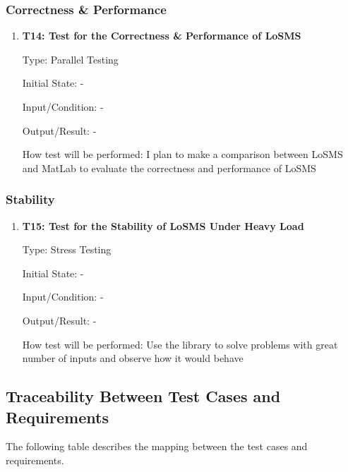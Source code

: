 \documentclass[12pt, titlepage]{article}
\newcommand{\famname}{LoSMS} %
\begin{document}
\subsubsection{Correctness \& Performance}

\begin{enumerate}
	\item{\textbf{T14: Test for the Correctness \& Performance of \famname{}}}
	
	Type: Parallel Testing
	
	Initial State: -
	
	Input/Condition: -
	
	Output/Result: -
	
	How test will be performed: I plan to make a comparison between \famname{} 
	and MatLab to evaluate the correctness and performance of \famname{}
\end{enumerate}

\subsubsection{Stability}

\begin{enumerate}
	\item{\textbf{T15: Test for the Stability of \famname{} Under Heavy Load}}
	
	Type: Stress Testing
	
	Initial State: -
	
	Input/Condition: -
	
	Output/Result: -
	
	How test will be performed: Use the library to solve problems with great 
	number of inputs and observe how it would behave
\end{enumerate}

\subsection{Traceability Between Test Cases and Requirements}

The following table describes the mapping between the test cases and 
requirements.
\end{document}
